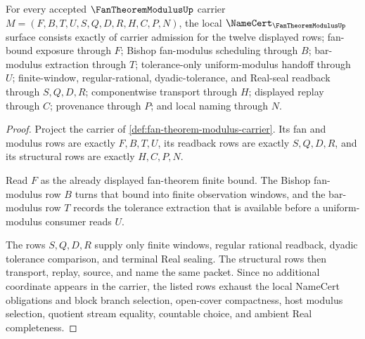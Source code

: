\begin{theorem}
\label{thm:fan-theorem-modulus-namecert-obligations}
For every accepted $\FanTheoremModulusUp$ carrier $M=(F,B,T,U,S,Q,D,R,H,C,P,N)$, the local $\NameCert_{\FanTheoremModulusUp}$ surface consists exactly of carrier admission for the twelve displayed rows; fan-bound exposure through $F$; Bishop fan-modulus scheduling through $B$; bar-modulus extraction through $T$; tolerance-only uniform-modulus handoff through $U$; finite-window, regular-rational, dyadic-tolerance, and Real-seal readback through $S,Q,D,R$; componentwise transport through $H$; displayed replay through $C$; provenance through $P$; and local naming through $N$.
\end{theorem}
\begin{proof}
Project the carrier of \autoref{def:fan-theorem-modulus-carrier}. Its fan and modulus rows are exactly $F,B,T,U$, its readback rows are exactly $S,Q,D,R$, and its structural rows are exactly $H,C,P,N$.

Read $F$ as the already displayed fan-theorem finite bound. The Bishop fan-modulus row $B$ turns that bound into finite observation windows, and the bar-modulus row $T$ records the tolerance extraction that is available before a uniform-modulus consumer reads $U$.

The rows $S,Q,D,R$ supply only finite windows, regular rational readback, dyadic tolerance comparison, and terminal Real sealing. The structural rows then transport, replay, source, and name the same packet. Since no additional coordinate appears in the carrier, the listed rows exhaust the local NameCert obligations and block branch selection, open-cover compactness, host modulus selection, quotient stream equality, countable choice, and ambient Real completeness.
\end{proof}

